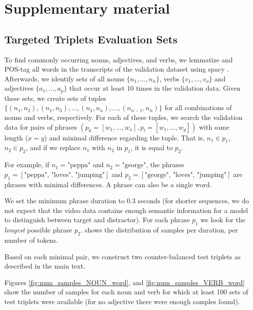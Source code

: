 \appendix

\section{Supplementary material}



\subsection{Targeted Triplets Evaluation Sets}\label{app:targeted_triplets_eval}

To find commonly occurring nouns, adjectives, and verbs, we lemmatize and POS-tag all words in the transcripts of the validation dataset using spacy \citep{honnibal2020spacy}. Afterwards, we identify sets of all nouns $\{n_1, ..., n_n\}$, verbs $\{v_1, ..., v_o\}$ and adjectives $\{a_1, ..., a_p\}$ that occur at least 10 times in the validation data. Given these sets, we create sets of tuples $\{(n_1, n_2), (n_1, n_3), ..., (n_1, n_n), ...,  (n_{n-1}, n_n)\}$ for all combinations of nouns and verbs, respectively. For each of these tuples, we search the validation data for pairs of phrases $(p_k=[w_1, ..., w_x], p_l=[w_1, ..., w_y])$ with same length ($x=y$) and minimal difference regarding the tuple. That is, $n_1 \in p_1$, $n_2 \in p_2$, and if we replace $n_1$ with $n_2$ in $p_1$, it is equal to $p_2$. 

For example, if $n_1 = \text{"peppa"}$ and $n_2 = \text{"george"}$, the phrases $p_1 = [\text{"peppa", "loves", "jumping"}]$ and $p_2 = [\text{"george", "loves", "jumping"}]$ are phrases with minimal differences. A phrase can also be a single word.

We set the minimum phrase duration to 0.3 seconds (for shorter sequences, we do not expect that the video data contains enough semantic information for a model to distinguish between target and distractor). For each phrase $p_1$ we look for the \textit{longest} possible phrase $p_2$.  shows the distribution of samples per duration,  per number of tokens.

Based on each minimal pair, we construct two counter-balanced test triplets as described in the main text.

Figures \ref{fig:num_samples_NOUN_word}, and \ref{fig:num_samples_VERB_word} show the number of samples for each noun and verb for which at least 100 sets of test triplets were available (for no adjective there were enough samples found).



